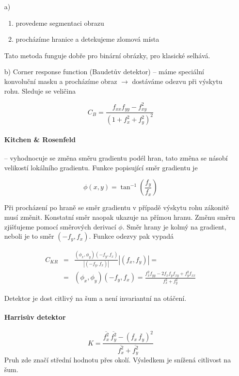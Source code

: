 
\begin{itemize}
\item[a)]
\begin{enumerate}
\item provedeme segmentaci obrazu
\item procházíme hranice a detekujeme zlomová místa
\end{enumerate}
Tato metoda funguje dobře pro binární obrázky, pro klasické selhává.
\item[b)] Corner response function (Baudetův detektor) -- 
máme speciální konvoluční masku a procházíme obraz $\rightarrow$ 
dostáváme odezvu při výskytu rohu. Sleduje se veličina 

\begin{equation}
C_B=\frac{f_{xx}f_{yy}-f_{xy}^2}{(1+f_x^2+f_y^2)^2}
\end{equation}

\paragraph{Kitchen \& Rosenfeld} -- vyhodnocuje se změna směru gradientu podél hran, tato změna se násobí 
velikostí lokálního gradientu. Funkce popisující směr gradientu je

\begin{equation}
\phi(x,y)=\tan^{-1}\left(\frac{f_y}{f_x}\right)
\end{equation}

Při procházení po hraně se směr gradientu v případě výskytu rohu zákonitě musí změnit. Konstatní směr naopak
ukazuje na přímou hranu. Změnu směru zjišťujeme pomocí směrových derivací $\phi$. Směr hrany je kolmý na gradient,
neboli je to směr $(-f_y,f_x)$. Funkce odezvy pak vypadá

\begin{eqnarray}
C_{KR}&=&\frac{(\phi_x,\phi_y)(-f_y,f_x)}{\left|(-f_y,f_x)\right|}\left|(f_x,f_y)\right|=\nonumber\\
&=&(\phi_x,\phi_y)(-f_y,f_x)=\frac{f^2_xf_{yy}-2f_xf_yf_{xy}+f_y^2f_{xx}}{f_x^2+f_y^2}
\end{eqnarray}

Detektor je dost citlivý na šum a není invariantní na otáčení.


\paragraph{Harrisův detektor}
\begin{equation}
K=\frac{\overline{f^2_x}\,\overline{f^2_y}-(\overline{f_x}\,\overline{f_y})^2}{\overline{f^2_x}+\overline{f^2_y}}
\end{equation}
Pruh zde značí střední hodnotu přes okolí. Výsledkem je snížená citlivost na šum.

\end{itemize}


